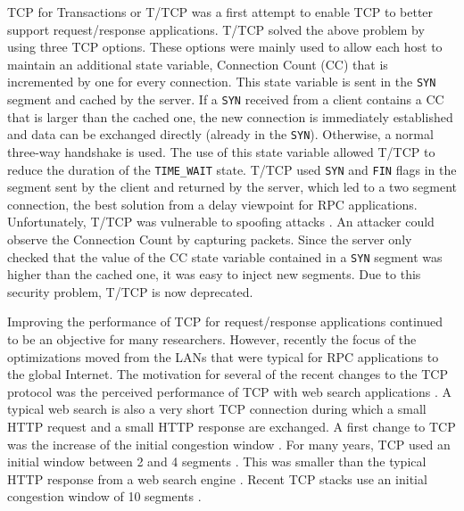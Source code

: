 TCP for Transactions or T/TCP \cite{rfc1644} was a first attempt to enable TCP to better support request/response applications. T/TCP solved the above problem by using three TCP options. These options were mainly used to allow each host to maintain an additional state variable, Connection Count (CC) that is incremented by one for every connection. This state variable is sent in the \texttt{SYN} segment and cached by the server. If a \texttt{SYN} received from a client contains a CC that is larger than the cached one, the new connection is immediately established and data can be exchanged directly (already in the \texttt{SYN}). Otherwise, a normal three-way handshake is used. The use of this state variable allowed T/TCP to reduce the duration of the \texttt{TIME\_WAIT} state. T/TCP used \texttt{SYN} and \texttt{FIN} flags in the segment sent by the client and returned by the server, which led to a two segment connection, the best solution from a delay viewpoint for RPC applications. Unfortunately, T/TCP was vulnerable to spoofing attacks \cite{deVivo_TTCP:1999}. An attacker could observe the Connection Count by capturing packets. Since the server only checked that the value of the CC state variable contained in a \texttt{SYN} segment was higher than the cached one, it was easy to inject new segments. Due to this security problem, T/TCP is now deprecated.


Improving the performance of TCP for request/response applications continued to be an objective for many researchers. However, recently the focus of the optimizations moved from the LANs that were typical for RPC applications to the global Internet. The motivation for several of the recent changes to the TCP protocol was the perceived performance of TCP with web search applications \cite{Chu_Tuning:2009}. A typical web search is also a very short TCP connection during which a small HTTP request and a small HTTP response are exchanged. A first change to TCP was the increase of the initial congestion window \cite{Chu_increasing:2013}. For many years, TCP used an initial window between 2 and 4 segments \cite{rfc3390}. This was smaller than the typical HTTP response from a web search engine \cite{Chu_Tuning:2009}. Recent TCP stacks use an initial congestion window of 10 segments \cite{Chu_increasing:2013}.

